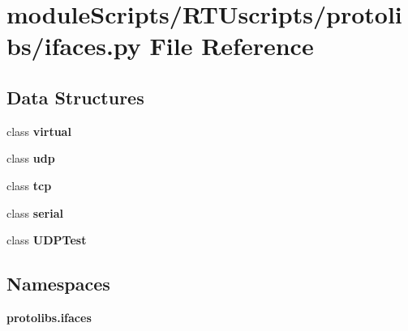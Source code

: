 \section{module\+Scripts/\+R\+T\+Uscripts/protolibs/ifaces.py File Reference}
\label{ifaces_8py}
\subsection*{Data Structures}
\begin{DoxyCompactItemize}
\item 
class {\bf virtual}
\item 
class {\bf udp}
\item 
class {\bf tcp}
\item 
class {\bf serial}
\item 
class {\bf U\+D\+P\+Test}
\end{DoxyCompactItemize}
\subsection*{Namespaces}
\begin{DoxyCompactItemize}
\item 
 {\bf protolibs.\+ifaces}
\end{DoxyCompactItemize}
